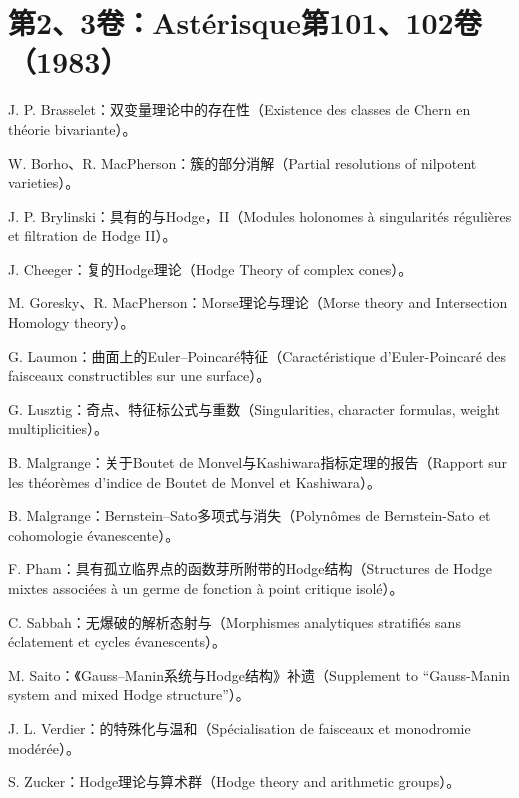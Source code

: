 \section*{第2、3卷：Astérisque第101、102卷（1983）}
\begin{description}[leftmargin=2.8em,labelwidth=2.3em,font=\normalfont]
\item[{[2]}] J. P. Brasselet：双变量理论中的存在性（Existence des classes de Chern en théorie bivariante）。
\item[{[3]}] W. Borho、R. MacPherson：簇的部分消解（Partial resolutions of nilpotent varieties）。
\item[{[4]}] J. P. Brylinski：具有的与Hodge，II（Modules holonomes à singularités régulières et filtration de Hodge II）。
\item[{[5]}] J. Cheeger：复的Hodge理论（Hodge Theory of complex cones）。
\item[{[6]}] M. Goresky、R. MacPherson：Morse理论与理论（Morse theory and Intersection Homology theory）。
\item[{[7]}] G. Laumon：曲面上的Euler--Poincaré特征（Caractéristique d'Euler-Poincaré des faisceaux constructibles sur une surface）。
\item[{[8]}] G. Lusztig：奇点、特征标公式与重数（Singularities, character formulas, weight multiplicities）。
\item[{[9]}] B. Malgrange：关于Boutet de Monvel与Kashiwara指标定理的报告（Rapport sur les théorèmes d'indice de Boutet de Monvel et Kashiwara）。
\item[{[10]}] B. Malgrange：Bernstein--Sato多项式与消失（Polynômes de Bernstein-Sato et cohomologie évanescente）。
\item[{[11]}] F. Pham：具有孤立临界点的函数芽所附带的Hodge结构（Structures de Hodge mixtes associées à un germe de fonction à point critique isolé）。
\item[{[12]}] C. Sabbah：无爆破的解析态射与（Morphismes analytiques stratifiés sans éclatement et cycles évanescents）。
\item[{[13]}] M. Saito：《Gauss--Manin系统与Hodge结构》补遗（Supplement to ``Gauss-Manin system and mixed Hodge structure''）。
\item[{[14]}] J. L. Verdier：的特殊化与温和（Spécialisation de faisceaux et monodromie modérée）。
\item[{[15]}] S. Zucker：Hodge理论与算术群（Hodge theory and arithmetic groups）。
\end{description}
